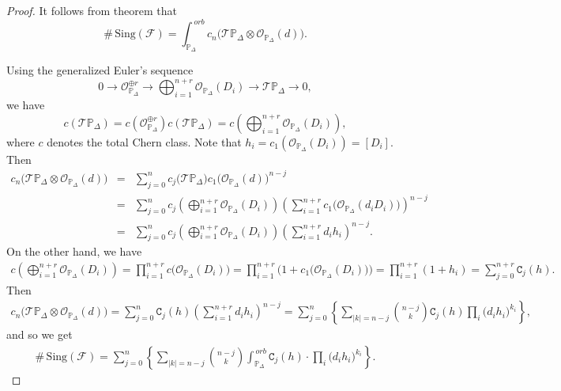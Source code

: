 \documentclass[11pt]{amsart}
\theoremstyle{plain}
\theoremstyle{definition}
\begin{document}
\begin{proof} It follows from theorem \cite[Theorem 1]{Mig} that
$$\#\,\mathrm{Sing}(\mathcal{F})
=\int_{\mathbb{P}_{\Delta}}^{\,orb} c_{n}\big(\mathcal{T}\mathbb{P}_{\Delta}\otimes\mathcal{O}_{\mathbb{P}_{\Delta}}(d)\big).$$

\noindent Using the generalized Euler's sequence
$$0\rightarrow \mathcal{O}_{\mathbb{P}_{\Delta}}^{\oplus r}\rightarrow\bigoplus_{i=1}^{n+r}\mathcal{O}_{\mathbb{P}_{\Delta}}(D_i)
\rightarrow\mathcal{T}\mathbb{P}_{\Delta}\rightarrow0,$$
we have 
$$c\left(\mathcal{T}\mathbb{P}_{\Delta}\right)
=c\left(\mathcal{O}^{\oplus r}_{\mathbb{P}_{\Delta}}\right)c\left(\mathcal{T}\mathbb{P}_{\Delta}\right)
=c\left(\bigoplus_{i=1}^{n+r} \mathcal{O}_{\mathbb{P}_{\Delta}}(D_i)\right),$$
where $c$ denotes the total Chern class. 
Note that $h_i=c_{1}(\mathcal{O}_{\mathbb{P}_{\Delta}}(D_i))=\left[D_i\right]$. Then
\begin{eqnarray*}
c_{n}\big(\mathcal{T}\mathbb{P}_{\Delta}\otimes\mathcal{O}_{\mathbb{P}_{\Delta}}(d)\big) &=&
\sum_{j=0}^{n}c_{j}\big(\mathcal{T}\mathbb{P}_{\Delta}\big)c_{1}\big(\mathcal{O}_{\mathbb{P}_{\Delta}}(d)\big)^{n-j} \nonumber\\
&=&\sum_{j=0}^{n}c_{j}\left(\bigoplus_{i=1}^{n+r} \mathcal{O}_{\mathbb{P}_{\Delta}}(D_i)\right)
\left(\sum_{i=1}^{n+r}c_1\big(\mathcal{O}_{\mathbb{P}_{\Delta}}(d_iD_i)\big)\right)^{n-j} \nonumber\\
&=& \sum_{j=0}^{n}c_{j}\left(\bigoplus_{i=1}^{n+r} \mathcal{O}_{\mathbb{P}_{\Delta}}(D_i)\right)
\left(\sum_{i=1}^{n+r} d_ih_i \right)^{n-j}.
\end{eqnarray*}
On the other hand, we have  
\begin{eqnarray*}
c\left(\bigoplus_{i=1}^{n+r} \mathcal{O}_{\mathbb{P}_{\Delta}}(D_i)\right)=
\prod_{i=1}^{n+r}c\big(\mathcal{O}_{\mathbb{P}_{\Delta}}(D_i)\big)=
\prod_{i=1}^{n+r}\Big(1+c_1\big(\mathcal{O}_{\mathbb{P}_{\Delta}}(D_i)\big)\Big)
=\prod_{i=1}^{n+r}(1+h_{i})=\sum_{j=0}^{n+r}\texttt{C}_{j}(h).
\end{eqnarray*}
Then 
\begin{eqnarray*}
c_{n}\big(\mathcal{T}\mathbb{P}_{\Delta}\otimes\mathcal{O}_{\mathbb{P}_{\Delta}}(d)\big)
=\sum_{j=0}^{n}\texttt{C}_j(h)\left(\sum_{i=1}^{n+r} d_ih_i \right)^{n-j}
=\sum_{j=0}^{n}\left\{\sum_{\left|k\right|=n-j}\binom{n-j}{k}\texttt{C}_j(h)
\prod_i \big(d_ih_i\big)^{k_i}\right\},
\end{eqnarray*}
and so we get  
\begin{eqnarray*}
\#\,\mathrm{Sing}(\mathcal{F})
=\sum_{j=0}^{n}\left\{\sum_{\left|k\right|=n-j}\binom{n-j}{k} \int_{\mathbb{P}_{\Delta}}^{\,orb} 
\texttt{C}_j(h)\cdot \prod_i \big(d_ih_i\big)^{k_i}\right\}.
\end{eqnarray*}
\end{proof}
\end{document}
